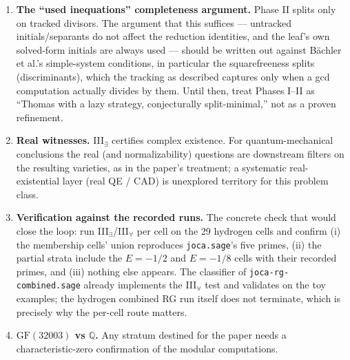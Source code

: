 \documentclass[11pt]{article}
\newcommand{\code}[1]{\texttt{#1}}
\begin{document}
\begin{enumerate}
  \emph{Update} (\S\ref{sec:staged}): per-cell staging in its obvious form
  --- re-run differential Thomas on $T_j\cup\{P\}$ --- itself fails on five
  of the 29 cells \cite{staging-swell}, and the failure is not coefficient
  swell but intra-step live-set swell inside the re-completion. The
  fixed-chain prolongation of \S\ref{sec:fixed-chain} is the proposed way
  past it: it deletes the re-completion, keeps the reduction (which is
  measurably cheap on all 29 cells), and reduces the whole per-cell
  $\exists$ question to a commutative $D$-closure computation in six
  non-constant variables. \textbf{Unmeasured}: whether $\partial^k\rho_j$
  stays small under \eqref{eq:cell-derivation}. That is the next
  experiment, and it is cheap.
\item \textbf{The ``used inequations'' completeness argument.} Phase II
  splits only on tracked divisors. The argument that this suffices ---
  untracked initials/separants do not affect the reduction identities, and
  the leaf's own solved-form initials are always used --- should be written
  out against B\"achler et al.'s simple-system conditions, in particular the
  squarefreeness splits (discriminants), which the tracking as described
  captures only when a gcd computation actually divides by them. Until then,
  treat Phases I--II as ``Thomas with a lazy strategy, conjecturally
  split-minimal,'' not as a proven refinement.
\item \textbf{Real witnesses.} III$_\exists$ certifies complex existence.
  For quantum-mechanical conclusions the real (and normalizability)
  questions are downstream filters on the resulting varieties, as in the
  paper's treatment; a systematic real-existential layer (real QE / CAD)
  is unexplored territory for this problem class.
\item \textbf{Verification against the recorded runs.} The concrete check
  that would close the loop: run III$_\exists$/III$_\forall$ per cell on the
  29 hydrogen cells and confirm (i) the membership cells' union reproduces
  \code{joca.sage}'s five primes, (ii) the partial strata include the
  $E=-1/2$ and $E=-1/8$ cells with their recorded primes, and (iii) nothing
  else appears. The classifier of \code{joca-rg-combined.sage} already
  implements the III$_\forall$ test and validates on the toy examples; the
  hydrogen combined RG run itself does not terminate, which is precisely why
  the per-cell route matters.
\item \textbf{$\mathrm{GF}(32003)$ vs $\mathbb{Q}$.} Any stratum destined for
  the paper needs a characteristic-zero confirmation of the modular
  computations.
\end{enumerate}
\end{document}
